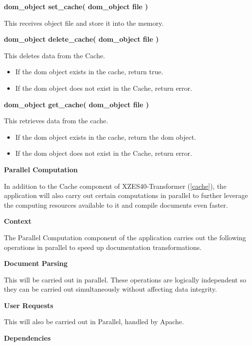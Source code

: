 \textbf{dom\_object set\_cache( dom\_object file )} 

This receives object file and store it into the memory.

\textbf{dom\_object delete\_cache( dom\_object file )}

This deletes data from the Cache.

\begin{itemize}
    \item If the \gls{dom} object exists in the cache, return true.
    \item If the \gls{dom} object does not exist in the Cache, return error.
\end{itemize}

\textbf{dom\_object get\_cache( dom\_object file )} 

This retrieves data from the cache.

\begin{itemize}
    \item If the \gls{dom} object exists in the cache, return the \gls{dom} object.
    \item If the \gls{dom} object does not exist in the Cache, return error.
\end{itemize}

\textbf{Parallel Computation}
\label{parallel-computation}

In addition to the Cache component of XZES40-Transformer (\ref{cache}), the application will also carry out certain computations in parallel to further leverage the computing resources available to it and compile documents even faster.

\textbf{Context}

The Parallel Computation component of the application carries out the following operations in parallel to speed up documentation transformations.

\textbf{Document Parsing}

This will be carried out in parallel.
These operations are logically independent so they can be carried out simultaneously without affecting data integrity.

\textbf{User Requests} 

This will also be carried out in Parallel, handled by Apache.

\textbf{Dependencies}

